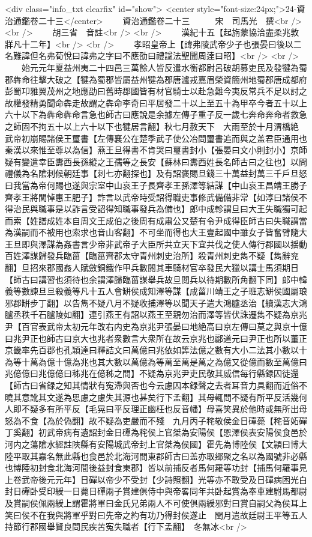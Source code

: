 <div class="info_txt clearfix" id="show">
<center style="font-size:24px;">24-資治通鑑卷二十三</center>
  　　資治通鑑卷二十三　　　宋　司馬光　撰<br />
<br />
　　胡三省　音註<br />
<br />
　　漢紀十五【起旃蒙協洽盡柔兆敦牂凡十二年】<br />
<br />
　　孝昭皇帝上【諱弗陵武帝少子也張晏曰後以二名難諱但名弗荀悅曰諱弗之字曰不應劭曰禮諡法聖聞周逹曰昭】<br />
<br />
　　始元元年夏益州夷二十四邑三萬餘人皆反遣水衡都尉呂破胡募吏民及發犍為蜀郡犇命往擊大破之【犍為蜀郡皆屬益州犍為郡唐瀘戎嘉眉榮資簡州地蜀郡唐成都府彭蜀卭雅翼茂州之地應劭曰舊時郡國皆有材官騎士以赴急難今夷反常兵不足以討之故權發精勇聞命犇走故謂之犇命李奇曰平居發二十以上至五十為甲卒今者五十以上六十以下為犇命犇命言急也師古曰應說是余據左傳子重子反一歲七奔命奔命者救急之師固不拘五十以上六十以下也犍居言翻】秋七月赦天下　大雨至於十月渭橋絶　武帝初崩賜諸侯王璽書【左傳襄公在楚季武子使公冶問璽書追而與之盖君臣通用也秦漢以來惟至尊以為信】燕王旦得書不肯哭曰璽書封小【張晏曰文小則封小】京師疑有變遣幸臣夀西長孫縱之王孺等之長安【蘇林曰夀西姓長名師古曰之往也】以問禮儀為名隂刺候朝廷事【刺七亦翻探也】及有詔褒賜旦錢三十萬益封萬三千戶旦怒曰我當為帝何賜也遂與宗室中山哀王子長齊孝王孫澤等結謀【中山哀王昌靖王勝子齊孝王將閭悼惠王肥子】詐言以武帝時受詔得職吏事修武備備非常【如淳曰諸侯不得治民與職事是以詐言受詔得知職事發兵為備也】郎中成軫謂旦曰大王失職獨可起而索【姓譜成姓本自周文王成伯之後周有成肅公又楚有令尹成得臣師古曰失職謂當為漢嗣而不被用也索求也音山客翻】不可坐而得也大王壹起國中雖女子皆奮臂隨大王旦即與澤謀為姦書言少帝非武帝子大臣所共立天下宜共伐之使人傳行郡國以揺動百姓澤謀歸發兵臨菑【臨菑齊郡太守青州刺史治所】殺青州刺史雋不疑【雋辭兖翻】旦招來郡國姦人賦斂銅鐵作甲兵數閱其車騎材官卒發民大獵以講士馬須期日【師古曰講習也須待也余謂澤歸臨菑謀舉兵故旦閲兵以待期數所角翻下同】郎中韓義等數諫旦旦殺義等凡十五人會缾侯成知澤等謀【成菑川靖王之子班志缾侯國屬琅邪郡缾步丁翻】以告雋不疑八月不疑收捕澤等以聞天子遣大鴻臚丞治【續漢志大鴻臚丞秩千石臚陵如翻】連引燕王有詔以燕王至親勿治而澤等皆伏誅遷雋不疑為京兆尹【百官表武帝太初元年改右内史為京兆尹張晏曰地絶高曰京左傳曰莫之與京十億曰兆尹正也師古曰京大也兆者衆數言大衆所在故云京兆也酈道元曰尹正也所以董正京畿率先百郡也孔穎達曰釋詰文曰萬億曰兆依如筭法億之數有大小二法其小數以十為等十萬為億十億為兆也其大數以萬億為等萬至萬是萬之為億又從億而數至萬億曰兆億億曰兆億億曰秭兆在億秭之間】不疑為京兆尹吏民敬其威信每行縣録囚徒還【師古曰省録之知其情狀有寃滯與否也今云慮囚本録聲之去者耳音力具翻而近俗不曉其意訛其文遂為思慮之慮失其源也甚矣行下孟翻】其母輒問不疑有所平反活幾何人即不疑多有所平反【毛晃曰平反理正幽枉也反音幡】母喜笑異於他時或無所出母怒為不食【為於偽翻】故不疑為吏嚴而不殘　九月丙子秺敬侯金日磾薨【秺音妬磾丁奚翻】初武帝病有遺詔封金日磾為秺侯上官桀為安陽侯【恩澤侯表安陽侯食邑於河内之蕩隂水經註陜縣有安陽城武帝封上官桀為侯國】霍先為博陸侯【文頴曰博大陸平取其嘉名無此縣也食邑於北海河間東郡師古曰盖亦取郷聚之名以為國號非必縣也博陸初封食北海河間後益封食東郡】皆以前捕反者馬何羅等功封【捕馬何羅事見上卷武帝後元元年】日磾以帝少不受封【少詩照翻】光等亦不敢受及日磾病困光白封日磾卧受印綬一日薨日磾兩子賞建俱侍中與帝畧同年共卧起賞為奉車建駙馬都尉及賞嗣侯佩兩綬上謂霍將軍曰金氏兄弟兩人不可使俱兩綬邪對曰賞自嗣父為侯耳上笑曰侯不在我與將軍乎對曰先帝之約有功乃得封侯遂止　閏月遣故廷尉王平等五人持節行郡國舉賢良問民疾苦寃失職者【行下孟翻】　冬無冰<br />
